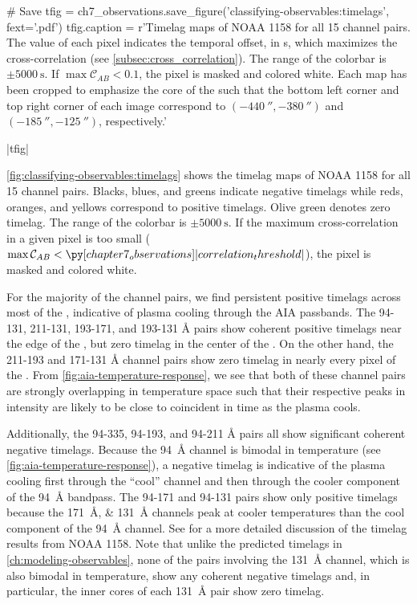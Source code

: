 \begin{pycode}
# Save
tfig = ch7_observations.save_figure('classifying-observables:timelags', fext='.pdf')
tfig.caption = r'Timelag maps of \AR{} NOAA 1158 for all 15 channel pairs. The value of each pixel indicates the temporal offset, in \si{\second}, which maximizes the cross-correlation (see \autoref{subsec:cross_correlation}). The range of the colorbar is $\pm\SI{5000}{\second}$. If $\max\mathcal{C}_{AB}<0.1$, the pixel is masked and colored white. Each map has been cropped to emphasize the core of the \AR{} such that the bottom left corner and top right corner of each image correspond to $(\SI{-440}{\arcsecond},\SI{-380}{\arcsecond})$ and $(\SI{-185}{\arcsecond},\SI{-125}{\arcsecond})$, respectively.'
\end{pycode}
|tfig|

\autoref{fig:classifying-observables:timelags} shows the timelag maps of \AR{} NOAA 1158 for all 15 channel pairs. Blacks, blues, and greens indicate negative timelags while reds, oranges, and yellows correspond to positive timelags. Olive green denotes zero timelag. The range of the colorbar is $\pm\SI{5000}{\second}$. If the maximum cross-correlation in a given pixel is too small ($\max\mathcal{C}_{AB}<\py[chapter7_observations]|correlation_threshold|$), the pixel is masked and colored white.

For the majority of the channel pairs, we find persistent positive timelags across most of the \AR{}, indicative of plasma cooling through the AIA passbands. The 94-131, 211-131, 193-171, and 193-131 \si{\angstrom} pairs show coherent positive timelags near the edge of the \AR{}, but zero timelag in the center of the \AR{}. On the other hand, the 211-193 and 171-131 \si{\angstrom} channel pairs show zero timelag in nearly every pixel of the \AR{}. From \autoref{fig:aia-temperature-response}, we see that both of these channel pairs are strongly overlapping in temperature space such that their respective peaks in intensity are likely to be close to coincident in time as the plasma cools. 

Additionally, the 94-335, 94-193, and 94-211 \si{\angstrom} pairs all show significant coherent negative timelags. Because the \SI{94}{\angstrom} channel is bimodal in temperature (see \autoref{fig:aia-temperature-response}), a negative timelag is indicative of the plasma cooling first through the ``cool'' channel and then through the cooler component of the \SI{94}{\angstrom} bandpass. The 94-171 and 94-131 pairs show only positive timelags because the \SIlist{171;131}{\angstrom} channels peak at cooler temperatures than the cool component of the \SI{94}{\angstrom} channel. See \citet{viall_survey_2017} for a more detailed discussion of the timelag results from NOAA 1158. Note that unlike the predicted timelags in \autoref{ch:modeling-observables}, none of the pairs involving the \SI{131}{\angstrom} channel, which is also bimodal in temperature, show any coherent negative timelags and, in particular, the inner cores of each \SI{131}{\angstrom} pair show zero timelag.

